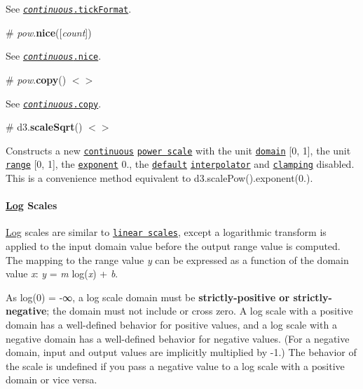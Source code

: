 See \href{#continuous_tickFormat}{\tt {\itshape continuous}.tick\+Format}.

\label{_pow_nice}%
\# {\itshape pow}.{\bfseries nice}(\mbox{[}{\itshape count}\mbox{]})

See \href{#continuous_nice}{\tt {\itshape continuous}.nice}.

\label{_pow_copy}%
\# {\itshape pow}.{\bfseries copy}() \href{https://github.com/d3/d3-scale/blob/master/src/pow.js#L29}{\tt $<$$>$}

See \href{#continuous_copy}{\tt {\itshape continuous}.copy}.

\label{_scaleSqrt}%
\# d3.{\bfseries scale\+Sqrt}() \href{https://github.com/d3/d3-scale/blob/master/src/pow.js#L36}{\tt $<$$>$}

Constructs a new \href{#continuous-scales}{\tt continuous} \href{#power-scales}{\tt power scale} with the unit \href{#continuous_domain}{\tt domain} \mbox{[}0, 1\mbox{]}, the unit \href{#continuous_range}{\tt range} \mbox{[}0, 1\mbox{]}, the \href{#pow_exponent}{\tt exponent} 0., the \href{https://github.com/d3/d3-interpolate#interpolate}{\tt default} \href{#continuous_interpolate}{\tt interpolator} and \href{#continuous_clamp}{\tt clamping} disabled. This is a convenience method equivalent to {\ttfamily d3.\+scale\+Pow().exponent(0.)}.

\paragraph*{\mbox{\hyperlink{classLog}{Log}} Scales}

\mbox{\hyperlink{classLog}{Log}} scales are similar to \href{#linear-scales}{\tt linear scales}, except a logarithmic transform is applied to the input domain value before the output range value is computed. The mapping to the range value {\itshape y} can be expressed as a function of the domain value {\itshape x}\+: {\itshape y} = {\itshape m} log({\itshape x}) + {\itshape b}.

As log(0) = -\/∞, a log scale domain must be {\bfseries strictly-\/positive or strictly-\/negative}; the domain must not include or cross zero. A log scale with a positive domain has a well-\/defined behavior for positive values, and a log scale with a negative domain has a well-\/defined behavior for negative values. (For a negative domain, input and output values are implicitly multiplied by -\/1.) The behavior of the scale is undefined if you pass a negative value to a log scale with a positive domain or vice versa.

